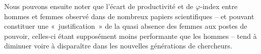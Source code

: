 		Nous pouvons ensuite noter que l'écart de productivité et de $\varphi$-index entre hommes et femmes observé dans de nombreux papiers scientifiques -- et pouvant constituer une «~justification~» de la quasi absence des femmes aux postes de pouvoir, celles-ci étant supposément moins performante que les hommes -- tend à diminuer voire à disparaître dans les nouvelles générations de chercheurs.
		
		
	
